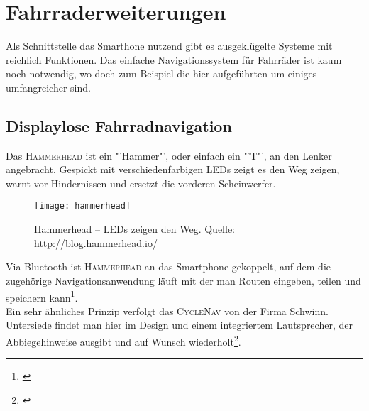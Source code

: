 \section{Fahrraderweiterungen}
Als Schnittstelle das Smarthone nutzend gibt es ausgeklügelte Systeme mit reichlich Funktionen. Das einfache Navigationssystem für Fahrräder ist kaum noch notwendig, wo doch zum Beispiel die hier aufgeführten um einiges umfangreicher sind.
\subsection{Displaylose Fahrradnavigation}
Das \textsc{Hammerhead} ist ein "'Hammer"', oder einfach ein "'T"', an den Lenker angebracht. Gespickt mit verschiedenfarbigen \gls{LED}s zeigt es den Weg zeigen, warnt vor Hindernissen und ersetzt die vorderen Scheinwerfer.
\begin{figure}[H]
    \centering
    \texttt{[image: hammerhead]}
    \caption[Hammerhead]{Hammerhead -- LEDs zeigen den Weg.  Quelle: \url{http://blog.hammerhead.io/}} \label{fig:hammerhead}
\end{figure}
Via Bluetooth ist \textsc{Hammerhead} an das Smartphone gekoppelt, auf dem die zugehörige Navigationsanwendung läuft mit der man Routen eingeben, teilen und speichern kann\footnote{\cite{Hammerhead}}.\\
 Ein sehr ähnliches Prinzip verfolgt das \textsc{CycleNav} von der Firma Schwinn. Untersiede findet man hier im Design und einem integriertem Lautsprecher, der Abbiegehinweise ausgibt und auf Wunsch wiederholt\footnote{\cite{CycleNav}}.
